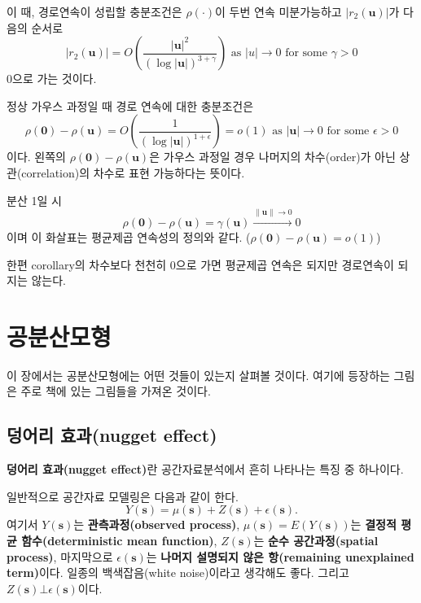 \documentclass[b5paper,]{scrbook}
\theoremstyle{plain}
\theoremstyle{definition}
\numberwithin{equation}{section}
\let\BeginKnitrBlock\begin \let\EndKnitrBlock\end
\begin{document}
이 때, 경로연속이 성립할 충분조건은 \(\rho (\cdot)\)이 두번 연속
미분가능하고 \(|r_{2}(\mathbf{u})|\)가 다음의 순서로
\[|r_{2}(\mathbf{u})|=O(\frac{|\mathbf{u}|^{2}}{(\log |\mathbf{u}|)^{3+\gamma}}) \text{ as } |u| \rightarrow 0 \text{ for some } \gamma >0\]
0으로 가는 것이다.

\BeginKnitrBlock{corollary}
\protect\hypertarget{cor:unnamed-chunk-265}{}{\label{cor:unnamed-chunk-265}
}정상 가우스 과정일 때 경로 연속에 대한 충분조건은
\[\rho(\mathbf{0})-\rho(\mathbf{u})=O(\frac{1}{(\log |\mathbf{u}|)^{1+\epsilon}})=o(1) \text{ as } |\mathbf{u}| \rightarrow 0 \text{ for some } \epsilon > 0\]
이다. 왼쪽의 \(\rho(\mathbf{0})-\rho(\mathbf{u})\)은 가우스 과정일 경우
나머지의 차수(order)가 아닌 상관(correlation)의 차수로 표현 가능하다는
뜻이다.
\EndKnitrBlock{corollary}

분산 1일 시
\[\rho(\mathbf{0})-\rho(\mathbf{u})=\gamma(\mathbf{u}) \stackrel{\|\mathbf{u}\| \rightarrow 0}{\rightarrow} 0\]
이며 이 화살표는 평균제곱 연속성의 정의와 같다.
(\(\rho(\mathbf{0})-\rho(\mathbf{u})=o(1)\))

한편 corollary의 차수보다 천천히 0으로 가면 평균제곱 연속은 되지만
경로연속이 되지는 않는다.

\chapter{공분산모형}\label{covmodel}

이 장에서는 공분산모형에는 어떤 것들이 있는지 살펴볼 것이다. 여기에
등장하는 그림은 주로 \citep{Montero2015} 책에 있는 그림들을 가져온
것이다.

\section{덩어리 효과(nugget effect)}\label{-nugget-effect}

\textbf{덩어리 효과(nugget effect)}란 공간자료분석에서 흔히 나타나는
특징 중 하나이다.

일반적으로 공간자료 모델링은 다음과 같이 한다.
\[Y(\mathbf{s})=\mu(\mathbf{s})+Z(\mathbf{s})+\epsilon(\mathbf{s}).\]
여기서 \(Y(\mathbf{s})\)는 \textbf{관측과정(observed process)},
\(\mu(\mathbf{s})=E(Y(\mathbf{s}))\)는 \textbf{결정적 평균
함수(deterministic mean function)}, \(Z(\mathbf{s})\)는 \textbf{순수
공간과정(spatial process)}, 마지막으로 \(\epsilon(\mathbf{s})\)는
\textbf{나머지 설명되지 않은 항(remaining unexplained term)}이다. 일종의
백색잡음(white noise)이라고 생각해도 좋다. 그리고
\(Z(\mathbf{s}) \bot \epsilon(\mathbf{s})\)이다.
\end{document}
